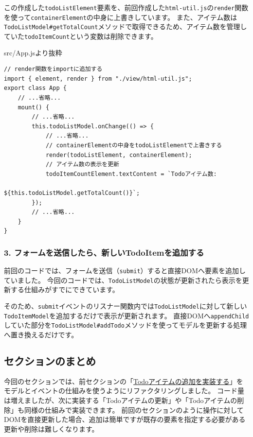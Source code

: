 この作成した\texttt{todoListElement}要素を、前回作成した\texttt{html-util.js}の\texttt{render}関数を使って\texttt{containerElement}の中身に上書きしています。
また、アイテム数は\texttt{TodoListModel\#getTotalCount}メソッドで取得できるため、アイテム数を管理していた\texttt{todoItemCount}という変数は削除できます。

\begin{listtitle}
src/App.jsより抜粋
\end{listtitle}
\begin{lstlisting}
// render関数をimportに追加する
import { element, render } from "./view/html-util.js";
export class App {
    // ...省略...
    mount() {
        // ...省略...
        this.todoListModel.onChange(() => {
            // ...省略...
            // containerElementの中身をtodoListElementで上書きする
            render(todoListElement, containerElement);
            // アイテム数の表示を更新
            todoItemCountElement.textContent = `Todoアイテム数: 
                                      ${this.todoListModel.getTotalCount()}`;
        });
        // ...省略...
    }
}
\end{lstlisting}
\listend

\hypertarget{app-add-new-todoitem}{%
\subsubsection{3. フォームを送信したら、新しいTodoItemを追加する}\label{app-add-new-todoitem}}

前回のコードでは、フォームを送信（\texttt{submit}）すると直接DOMへ要素を追加していました。
今回のコードでは、\texttt{TodoListModel}の状態が更新されたら表示を更新する仕組みがすでにできています。

そのため、\texttt{submit}イベントのリスナー関数内では\texttt{TodoListModel}に対して新しい\texttt{TodoItemModel}を追加するだけで表示が更新されます。
直接DOMへ\texttt{appendChild}していた部分を\texttt{TodoListModel\#addTodo}メソッドを使ってモデルを更新する処理へ置き換えるだけです。

\hypertarget{conclusion}{%
\subsection{セクションのまとめ}\label{conclusion}}

今回のセクションでは、前セクションの「\hyperlink{form-event}{Todoアイテムの追加を実装する}」をモデルとイベントの仕組みを使うようにリファクタリングしました。
コード量は増えましたが、次に実装する「Todoアイテムの更新」や「Todoアイテムの削除」も同様の仕組みで実装できます。
前回のセクションのように操作に対してDOMを直接更新した場合、追加は簡単ですが既存の要素を指定する必要がある更新や削除は難しくなります。

